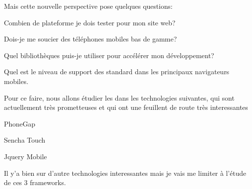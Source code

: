 Mais cette nouvelle perspective pose quelques questions:

        Combien de plateforme je dois tester pour mon site web?

        Dois-je me soucier des téléphones mobiles bas de gamme?

        Quel bibliothèques puis-je utiliser pour accélérer mon développement?

        Quel est le niveau de support des standard dans les principaux navigateurs mobiles.

Pour ce faire, nous allons étudier les dans les technologies suivantes, qui sont actuellement très prometteuses et qui ont une feuillent de route très interessantes

    PhoneGap

    Sencha Touch

    Jquery Mobile


Il y’a bien sur d’autre technologies interessantes mais je vais me limiter à l’étude de ces 3 frameworks.


